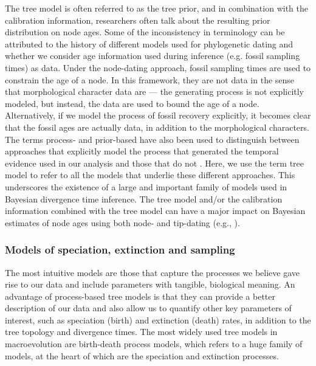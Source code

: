 \documentclass[11pt]{article}
\begin{document}
The tree model is often referred to as the tree prior, and in combination with the calibration information, researchers often talk about the resulting prior distribution on node ages.
Some of the inconsistency in terminology can be attributed to the history of different models used for phylogenetic dating and whether we consider age information used during inference (e.g. fossil sampling times) as data.
Under the node-dating approach, fossil sampling times are used to constrain the age of a node.
In this framework, they are not data in the sense that morphological character data are --- the generating process is not explicitly modeled, but instead, the data are used to bound the age of a node.
Alternatively, if we model the process of fossil recovery explicitly, it becomes clear that the fossil ages are actually data, in addition to the morphological characters.
The terms process- and prior-based have also been used to distinguish between approaches that explicitly model the  process that generated the temporal evidence used in our analysis and those that do not \cite{Landis2016}. 
Here, we use the term tree model to refer to all the models that underlie these different approaches.
This underscores the existence of a large and important family of models used in Bayesian divergence time inference.
The tree model and/or the calibration information combined with the tree model can have a major impact on Bayesian estimates of node ages using both node- and tip-dating (e.g., \cite{Ho2009,Warnock2011,OReilly2015,matzke2016,Matschiner2017}).

\subsubsection{Models of speciation, extinction and sampling}

The most intuitive models are those that capture the processes we believe gave rise to our data and include parameters with tangible, biological meaning.
An advantage of process-based tree models is that they can provide a better description of our data and also allow us to quantify other key parameters of interest, such as speciation (birth) and extinction (death) rates, in addition to the tree topology and divergence times.
The most widely used tree models in macroevolution are birth-death process models, which refers to a huge family of models, at the heart of which are the speciation and extinction processes. 
\end{document}
